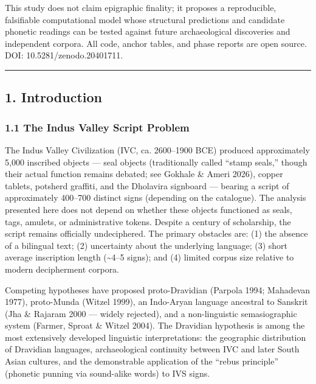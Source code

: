 \documentclass[
  11pt,
]{article}
\begin{document}
This study does not claim epigraphic finality; it proposes a
reproducible, falsifiable computational model whose structural
predictions and candidate phonetic readings can be tested against future
archaeological discoveries and independent corpora. All code, anchor
tables, and phase reports are open source. DOI: 10.5281/zenodo.20401711.

\begin{center}\rule{0.5\linewidth}{0.5pt}\end{center}

\subsection{1. Introduction}\label{introduction}

\subsubsection{1.1 The Indus Valley Script
Problem}\label{the-indus-valley-script-problem}

The Indus Valley Civilization (IVC, ca. 2600--1900 BCE) produced
approximately 5,000 inscribed objects --- seal objects (traditionally called ``stamp seals,'' though their actual function
remains debated; see Gokhale \& Ameri 2026), copper tablets,
potsherd graffiti, and the Dholavira signboard --- bearing a script of
approximately 400--700 distinct signs (depending on the catalogue). The analysis presented
here does not depend on whether these objects functioned as seals,
tags, amulets, or administrative tokens.
Despite a century of scholarship, the script remains officially
undeciphered. The primary obstacles are: (1) the absence of a bilingual
text; (2) uncertainty about the underlying language; (3) short average
inscription length (\textasciitilde4--5 signs); and (4) limited corpus
size relative to modern decipherment corpora.

Competing hypotheses have proposed proto-Dravidian (Parpola 1994;
Mahadevan 1977), proto-Munda (Witzel 1999), an Indo-Aryan language
ancestral to Sanskrit (Jha \& Rajaram 2000 --- widely rejected), and a
non-linguistic semasiographic system (Farmer, Sproat \& Witzel 2004).
The Dravidian hypothesis is among the most extensively developed
linguistic interpretations: the geographic distribution of Dravidian
languages, archaeological continuity between IVC and later South Asian
cultures, and the demonstrable application of the ``rebus principle''
(phonetic punning via sound-alike words) to IVS signs.
\end{document}
